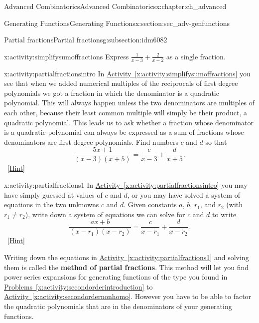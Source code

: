 \documentclass[oneside,10pt,]{book}
\newcommand{\terminology}[1]{\textbf{#1}}
\numberwithin{equation}{chapter}
\begin{document}
\begin{chapterptx}{Advanced Combinatorics}{}{Advanced Combinatorics}{}{}{x:chapter:ch_advanced}
\begin{sectionptx}{Generating Functions}{}{Generating Functions}{}{}{x:section:sec_adv-genfunctions}
\begin{subsectionptx}{Partial fractions}{}{Partial fractions}{}{}{g:subsection:idm6082}
\begin{activity}{}{x:activity:simplifysumoffractions}%
Express \(\frac{1}{x-3} + \frac{2}{x-2}\) as a single fraction.%
\end{activity}
\begin{activity}{}{x:activity:partialfractionsintro}%
In \hyperref[x:activity:simplifysumoffractions]{Activity~\ref{x:activity:simplifysumoffractions}} you see that when we added numerical multiples of the reciprocals of first degree polynomials we got a fraction in which the denominator is a quadratic polynomial. This will always happen unless the two denominators are multiples of each other, because their least common multiple will simply be their product, a quadratic polynomial. This leads us to ask whether a fraction whose denominator is a quadratic polynomial can always be expressed as a sum of fractions whose denominators are first degree polynomials. Find numbers \(c\) and \(d\) so that%
\begin{equation*}
\frac{5x+1}{(x-3)(x+5)} = \frac{c}{x-3} + \frac{d}{x+5}.
\end{equation*}
%
\qquad~\hfill{\tiny\hyperlink{g:hint:idm6099-back}{[Hint]}}\end{activity}
\begin{activity}{}{x:activity:partialfractions1}%
In \hyperref[x:activity:partialfractionsintro]{Activity~\ref{x:activity:partialfractionsintro}} you may have simply guessed at values of \(c\) and \(d\), or you may have solved a system of equations in the two unknowns \(c\) and \(d\). Given constants \(a\), \(b\), \(r_1\), and \(r_2\) (with \(r_1\not= r_2\)), write down a system of equations we can solve for \(c\) and \(d\) to write%
\begin{equation*}
\frac{ax+b}{(x-r_1)(x-r_2)} = \frac{c}{x-r_1} + \frac{d}{x-r_2}\text{.}
\end{equation*}
%
\qquad~\hfill{\tiny\hyperlink{g:hint:idm6134-back}{[Hint]}}\end{activity}
Writing down the equations in \hyperref[x:activity:partialfractions1]{Activity~\ref{x:activity:partialfractions1}} and solving them is called the \terminology{method of partial fractions}. This method will let you find power series expansions for generating functions of the type you found in \hyperref[x:activity:secondorderintroduction]{Problems~\ref{x:activity:secondorderintroduction}} to \hyperref[x:activity:secondordernonhomo]{Activity~\ref{x:activity:secondordernonhomo}}. However you have to be able to factor the quadratic polynomials that are in the denominators of your generating functions.%

\end{subsectionptx}
\end{sectionptx}
\end{chapterptx}
\end{document}
